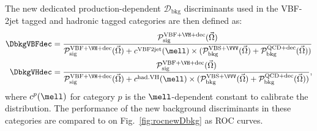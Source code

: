 The new dedicated production-dependent $\mathcal{D}_\text{bkg}$ discriminants used in the VBF-2jet tagged and hadronic \VH tagged categories are then defined as:
\begin{eqnarray}
\DbkgVBFdec = \frac{\mathcal{P}^{\mathrm{VBF}+\VH+\mathrm{dec}}_\mathrm{sig}(\vec\Omega) }{\mathcal{P}^{\mathrm{VBF}+\VH+\mathrm{dec}}_\mathrm{sig}(\vec\Omega) + c^{\mathrm{VBF 2jet}}(\mell) \times (\mathcal{P}^{\mathrm{VBS}+\VVV}_\mathrm{bkg}(\vec\Omega)+\mathcal{P}^{\mathrm{QCD}+\mathrm{dec}}_\mathrm{bkg}(\vec\Omega)) } \nonumber \\ 
\DbkgVHdec = \frac{\mathcal{P}^{\mathrm{VBF}+\VH+\mathrm{dec}}_\mathrm{sig}(\vec\Omega) }{\mathcal{P}^{\mathrm{VBF}+\VH+\mathrm{dec}}_\mathrm{sig}(\vec\Omega) + c^{\mathrm{had. VH}}(\mell) \times (\mathcal{P}^{\mathrm{VBS}+\VVV}_\mathrm{bkg}(\vec\Omega)+\mathcal{P}^{\mathrm{QCD}+\mathrm{dec}}_\mathrm{bkg}(\vec\Omega)) },
\label{eq:newDbkg} %
\end{eqnarray}
where $c^p(\mell)$ for category $p$ is the $\mell$-dependent constant to calibrate the distribution. The performance of the new background discriminants in these categories are compared to \Dbkgkin on Fig.~\ref{fig:rocnewDbkg} as ROC curves.

